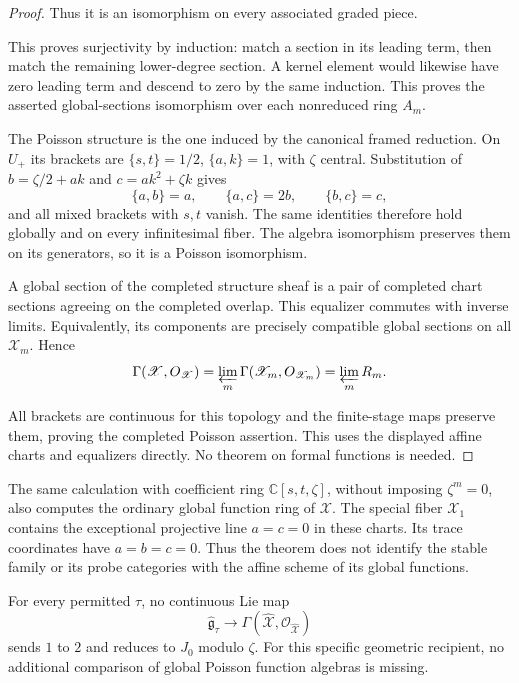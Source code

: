 \begin{proof}
Thus it is an isomorphism on every associated graded piece.

This proves surjectivity by induction: match a section in its leading
term, then match the remaining lower-degree section. A kernel
element would likewise have zero leading term and descend
to zero by the same induction. This proves the asserted
global-sections isomorphism over each nonreduced ring $A_m$.

The Poisson structure is the one induced by the canonical
framed reduction. On $U_+$ its brackets are
$\{s,t\}=1/2$, $\{a,k\}=1$, with $\zeta$ central.
Substitution of $b=\zeta/2+ak$ and $c=ak^2+\zeta k$
gives
\[
 \{a,b\}=a,\qquad\{a,c\}=2b,\qquad\{b,c\}=c,
\]
and all mixed brackets with $s,t$ vanish. The same identities
therefore hold globally and on every infinitesimal fiber.
The algebra isomorphism preserves them on its generators,
so it is a Poisson isomorphism.

A global section of the completed structure sheaf is a pair of
completed chart sections agreeing on the completed overlap. This
equalizer commutes with inverse limits. Equivalently, its
components are precisely compatible global sections on all
$\mathscr X_m$. Hence
\[
 \Gamma(\widehat{\mathscr X},\mathcal O_{\widehat{\mathscr X}})
 =\varprojlim_m\Gamma(\mathscr X_m,\mathcal O_{\mathscr X_m})
 =\varprojlim_m R_m.
\]

All brackets are continuous for this topology and the
finite-stage maps preserve them, proving the completed
Poisson assertion. This uses the displayed affine charts
and equalizers directly. No theorem on formal functions is
needed.
\end{proof}

The same calculation with coefficient ring
$\mathbb C[s,t,\zeta]$, without imposing $\zeta^m=0$,
also computes the ordinary global function ring of
$\mathscr X$. The special fiber $\mathscr X_1$ contains
the exceptional projective line $a=c=0$ in these charts. Its trace coordinates have $a=b=c=0$. Thus the theorem
does not identify the stable family or its probe categories
with the affine scheme of its global functions.

\begin{corollary}\label{mht:frgl:cor:geometric-obstruction}
For every permitted $\tau$, no continuous Lie map
\[
 \widehat{\mathfrak g}_\tau\longrightarrow
 \Gamma(\widehat{\mathscr X},\mathcal O_{\widehat{\mathscr X}})
\]
sends $1$ to $2$ and reduces to $J_0$ modulo $\zeta$.
For this specific geometric recipient, no additional
comparison of global Poisson function algebras is missing.
\end{corollary}

